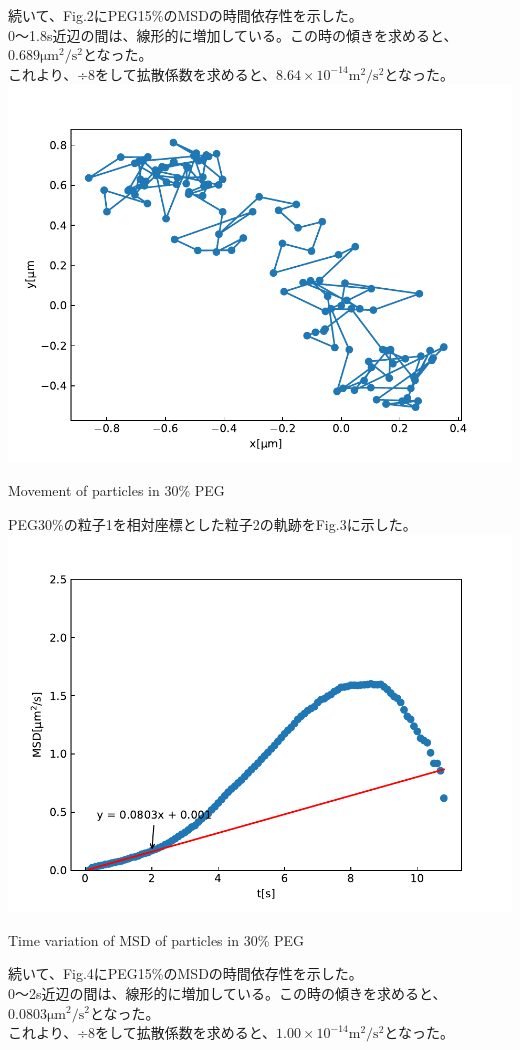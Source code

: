 \documentclass[a4paper,10pt]{jsarticle}
\makeatletter
\newenvironment{figurehere}
{\def\@captype{figure}}
{}
\makeatother
\begin{document}
続いて、Fig.2にPEG15\%のMSDの時間依存性を示した。\\
0〜1.8s近辺の間は、線形的に増加している。この時の傾きを求めると、$0.689 \text{μm}^2/\text{s}^2$となった。\\
これより、÷8をして拡散係数を求めると、$8.64×10^{-14} \text{m}^2/\text{s}^2$となった。\\

\begin{figurehere}
\centering
\includegraphics[width=0.7\linewidth]{fig/2_move_plot.pdf}
\caption{Movement of particles in 30\% PEG}
\label{fig:move_plot}
\end{figurehere}

PEG30\%の粒子1を相対座標とした粒子2の軌跡をFig.3に示した。\\

\begin{figurehere}
  \centering
  \includegraphics[width=0.7\linewidth]{fig/2_D.pdf}
  \caption{Time variation of MSD of particles in 30\% PEG}
  \label{fig:move_plot}
  \end{figurehere}

  続いて、Fig.4にPEG15\%のMSDの時間依存性を示した。\\
  0〜2s近辺の間は、線形的に増加している。この時の傾きを求めると、$0.0803 \text{μm}^2/\text{s}^2$となった。\\
  これより、÷8をして拡散係数を求めると、$1.00×10^{-14} \text{m}^2/\text{s}^2$となった。\\
\end{document}
